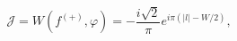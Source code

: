 \begin{equation}
\label{Eq_0217}
\mathcal{J} = W(f^{(+)}, \varphi)
	= - \frac{i\sqrt{2}}{\pi} e^{i\pi(|l| - W/2)},
\end{equation}

